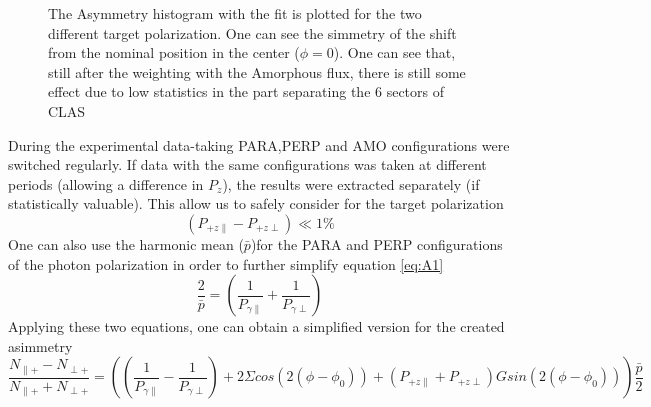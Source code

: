 \begin{figure}[htb]
  \begin{center}
    \caption{The Asymmetry histogram with the fit is plotted for the two different target polarization. One can see the simmetry of the shift from the nominal position in the center ($\phi = 0$).  One can see that, still after the weighting with the Amorphous flux, there is still some effect due to low statistics in the part separating the 6 sectors of CLAS}
    \label{fig:GTgpol}
  \end{center}
\end{figure} 
During the experimental data-taking PARA,PERP and AMO configurations were switched regularly. If data with the same configurations was taken at different periods (allowing a difference in $P_z$), the results were extracted separately (if statistically valuable). This allow us to safely consider for the target polarization
\begin{equation}
  (P_{+z\parallel}-P_{+z\perp}) \ll 1 \% 
\end{equation}
One can also use the harmonic mean ($\bar{p}$)for the PARA and PERP configurations of the photon polarization in order to further simplify equation \ref{eq:A1} 
\begin{equation}
  \frac{2}{\bar{p}} = \left(\frac{1}{P_{\gamma \parallel}} + \frac{1}{P_{\gamma \perp}}\right)
\end{equation}
Applying these two equations, one can obtain a simplified version for the created asimmetry
\begin{equation}
  \frac{N_{\parallel +} - N_{\perp +}}{N_{\parallel +} + N_{\perp +}} = \left( (\frac{1}{P_{\gamma \parallel}} - \frac{1}{P_{\gamma \perp}}) + 2 \Sigma cos(2(\phi-\phi_0)) +  (P_{+z\parallel}+P_{+z\perp}) G sin(2(\phi-\phi_0)) \right) \frac{\bar{p}}{2} \label{eq:A2}
\end{equation}
